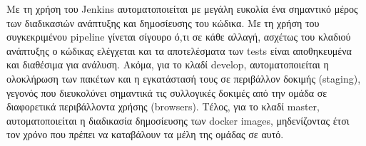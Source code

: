 Με τη χρήση του Jenkins αυτοματοποιείται με μεγάλη ευκολία ένα σημαντικό μέρος των διαδικασιών ανάπτυξης και δημοσίευσης του κώδικα. Με τη χρήση του συγκεκριμένου pipeline γίνεται σίγουρο ό,τι σε κάθε αλλαγή, ασχέτως του κλαδιού ανάπτυξης ο κώδικας ελέγχεται και τα αποτελέσματα των tests είναι αποθηκευμένα και διαθέσιμα για ανάλυση. Ακόμα, για το κλαδί develop, αυτοματοποιείται η ολοκλήρωση των πακέτων και η εγκατάστασή τους σε περιβάλλον δοκιμής (staging), γεγονός που διευκολύνει σημαντικά τις συλλογικές δοκιμές από την ομάδα σε διαφορετικά περιβάλλοντα χρήσης (browsers). Τέλος, για το κλαδί master, αυτοματοποιείται η διαδικασία δημοσίευσης των docker images, μηδενίζοντας έτσι τον χρόνο που πρέπει να καταβάλουν τα μέλη της ομάδας σε αυτό.
